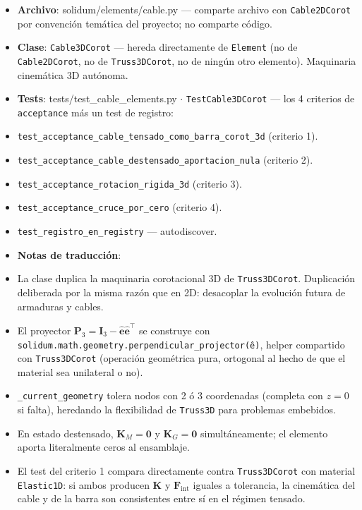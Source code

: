 \documentclass[11pt,letterpaper,oneside]{report}
\begin{document}
\begin{itemize}
  \item \textbf{Archivo}: solidum/elements/cable.py --- comparte archivo con \texttt{Cable2DCorot} por convención temática del proyecto; no comparte código.
  \item \textbf{Clase}: \texttt{Cable3DCorot} --- hereda directamente de \texttt{Element} (no de \texttt{Cable2DCorot}, no de \texttt{Truss3DCorot}, no de ningún otro elemento). Maquinaria cinemática 3D autónoma.
  \item \textbf{Tests}: tests/test\_cable\_elements.py \ensuremath{\cdot} \texttt{TestCable3DCorot} --- los 4 criterios de \texttt{acceptance} más un test de registro:
  \item \texttt{test\_acceptance\_cable\_tensado\_como\_barra\_corot\_3d} (criterio 1).
  \item \texttt{test\_acceptance\_cable\_destensado\_aportacion\_nula} (criterio 2).
  \item \texttt{test\_acceptance\_rotacion\_rigida\_3d} (criterio 3).
  \item \texttt{test\_acceptance\_cruce\_por\_cero} (criterio 4).
  \item \texttt{test\_registro\_en\_registry} --- autodiscover.
  \item \textbf{Notas de traducción}:
  \item La clase duplica la maquinaria corotacional 3D de \texttt{Truss3DCorot}. Duplicación deliberada por la misma razón que en 2D: desacoplar la evolución futura de armaduras y cables.
  \item El proyector $\mathbf P_3 = \mathbf I_3 - \hat{\mathbf e}\hat{\mathbf e}^\top$ se construye con \texttt{solidum.math.geometry.perpendicular\_projector(ê)}, helper compartido con \texttt{Truss3DCorot} (operación geométrica pura, ortogonal al hecho de que el material sea unilateral o no).
  \item \texttt{\_current\_geometry} tolera nodos con 2 ó 3 coordenadas (completa con $z=0$ si falta), heredando la flexibilidad de \texttt{Truss3D} para problemas embebidos.
  \item En estado destensado, $\mathbf K_M = \mathbf 0$ y $\mathbf K_G = \mathbf 0$ simultáneamente; el elemento aporta literalmente ceros al ensamblaje.
  \item El test del criterio 1 compara directamente contra \texttt{Truss3DCorot} con material \texttt{Elastic1D}: si ambos producen $\mathbf K$ y $\mathbf F_{\text{int}}$ iguales a tolerancia, la cinemática del cable y de la barra son consistentes entre sí en el régimen tensado.
\end{itemize}
\end{document}

